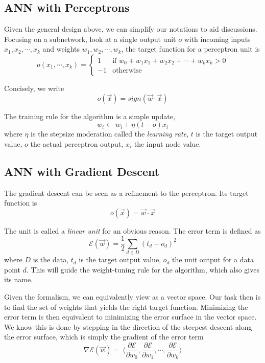 \documentclass[12pt]{article}  %
\begin{document}
\subsection{ANN with Perceptrons}

Given the general design above, we can simplify our notations to aid discussions. Focusing on a subnetwork, look at a single output unit $o$ with incoming inputs $x_1, x_2, \cdots, x_k$ and weights $w_1, w_2, \cdots, w_k$, the target function for a perceptron unit is
\[
o(x_1, \cdots, x_k) =
\begin{cases}
1 &\text{if } w_0 + w_1 x_1 + w_2 x_2 + \cdots + w_k x_k > 0\\
-1 &\text{otherwise }
\end{cases}
\]

Concisely, we write $$o(\vec{x}) = sign(\vec{w} \cdot \vec{x})$$

The training rule for the algorithm is a simple update, $$w_i \leftarrow w_i + \eta(t-o)x_i$$ where $\eta$ is the stepsize moderation called the {\em learning rate}, $t$ is the target output value, $o$ the actual perceptron output, $x_i$ the input node value.




\subsection{ANN with Gradient Descent}

The gradient descent can be seen as a refinement to the perceptron. Its target function is $$o(\vec{x}) = \vec{w} \cdot \vec{x}$$

The unit is called a {\em linear unit} for an obvious reason. The error term is defined as $$\mathcal{E}(\vec{w}) = \frac{1}{2} \sum_{d \in D} (t_d - o_d)^2$$ where $D$ is the data, $t_d$ is the target output value, $o_d$ the unit output for a data point $d$. This will guide the weight-tuning rule for the algorithm, which also gives its name.

Given the formalism, we can equivalently view as a vector space. Our task then is to find the set of weights that yields the right target function. Minimizing the error term is then equivalent to minimizing the error surface in the vector space. We know this is done by stepping in the direction of the steepest descent along the error surface, which is simply the gradient of the error term $$\nabla \mathcal{E}(\vec{w}) =\ \langle  \frac{\partial \mathcal{E}}{\partial w_0}, \frac{\partial \mathcal{E}}{\partial w_1}, \cdots, \frac{\partial \mathcal{E}}{\partial w_k}  \rangle$$
\end{document}
